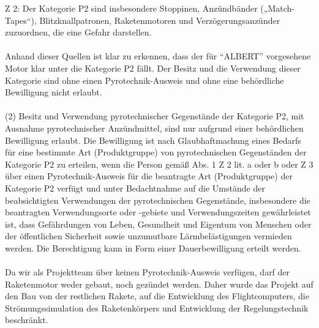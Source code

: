 Z 2: Der Kategorie P2 sind insbesondere Stoppinen, Anzündbänder („Match-Tapes“), Blitzknallpatronen, Raketenmotoren und Verzögerungsanzünder zuzuordnen, die eine Gefahr darstellen. \parencite{pyro_law_2010}
\\
\\
Anhand dieser Quellen ist klar zu erkennen, dass der für "`ALBERT"' vorgesehene Motor klar unter die Kategorie P2 fällt. Der Besitz und die Verwendung dieser Kategorie sind ohne einen Pyrotechnik-Ausweis und ohne eine behördliche Bewilligung nicht erlaubt.
\\
\\
(2) Besitz und Verwendung pyrotechnischer Gegenstände der Kategorie P2, mit Ausnahme pyrotechnischer Anzündmittel, sind nur aufgrund einer behördlichen Bewilligung erlaubt. Die Bewilligung ist nach Glaubhaftmachung eines Bedarfs für eine bestimmte Art (Produktgruppe) von pyrotechnischen Gegenständen der Kategorie P2 zu erteilen, wenn die Person gemäß Abs. 1 Z 2 lit. a oder b oder Z 3 über einen Pyrotechnik-Ausweis für die beantragte Art (Produktgruppe) der Kategorie P2 verfügt und unter Bedachtnahme auf die Umstände der beabsichtigten Verwendungen der pyrotechnischen Gegenstände, insbesondere die beantragten Verwendungsorte oder -gebiete und Verwendungszeiten gewährleistet ist, dass Gefährdungen von Leben, Gesundheit und Eigentum von Menschen oder der öffentlichen Sicherheit sowie unzumutbare Lärmbelästigungen vermieden werden. Die Berechtigung kann in Form einer Dauerbewilligung erteilt werden. \parencite{pyroTG_jusline}
\\
\\
Da wir als Projektteam über keinen Pyrotechnik-Ausweis verfügen, darf der Raketenmotor weder gebaut, noch gezündet werden. Daher wurde das Projekt auf den Bau von der restlichen Rakete, auf die Entwicklung des Flightcomputers, die Strömungssimulation des Raketenkörpers und Entwicklung der Regelungstechnik beschränkt.

